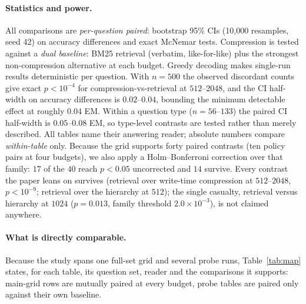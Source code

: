 \documentclass{article} %
\begin{document}
\paragraph{Statistics and power.} All comparisons are \emph{per-question paired}: bootstrap
95\% CIs (10{,}000 resamples, seed 42) on accuracy differences and exact McNemar tests.
Compression is tested against a \emph{dual baseline}: BM25 retrieval (verbatim, like-for-like)
plus the strongest non-compression alternative at each budget. Greedy decoding makes
single-run results deterministic per question. With $n{=}500$ the observed discordant counts
give exact $p<10^{-4}$ for compression-vs-retrieval at $512$--$2048$, and the CI half-width
on accuracy differences is $0.02$--$0.04$, bounding the minimum detectable effect at roughly
$0.04$ EM. Within a question type ($n{=}56$--$133$) the paired CI half-width is
$0.05$--$0.08$ EM, so type-level contrasts are tested rather than merely described. All
tables name their answering reader; absolute numbers compare \emph{within-table} only.
Because the grid supports forty paired contrasts (ten policy pairs at four budgets), we also
apply a Holm--Bonferroni correction over that family: $17$ of the $40$ reach $p<0.05$
uncorrected and $14$ survive. Every contrast the paper leans on survives (retrieval over
write-time compression at $512$--$2048$, $p<10^{-9}$; retrieval over the hierarchy at $512$);
the single casualty, retrieval versus hierarchy at $1024$ ($p{=}0.013$, family threshold
$2.0\times10^{-3}$), is not claimed anywhere.

\paragraph{What is directly comparable.} Because the study spans one full-set grid and several
probe runs, Table~\ref{tab:map} states, for each table, its question set, reader and the
comparisons it supports: main-grid rows are mutually paired at every budget, probe tables are
paired only against their own baseline.
\end{document}
